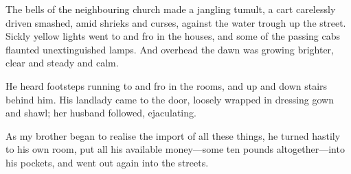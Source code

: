 The bells of the neighbouring church made a jangling tumult, a cart carelessly driven smashed, amid shrieks and curses, against the water trough up the street. Sickly yellow lights went to and fro in the houses, and some of the passing cabs flaunted unextinguished lamps. And overhead the dawn was growing brighter, clear and steady and calm.

He heard footsteps running to and fro in the rooms, and up and down stairs behind him. His landlady came to the door, loosely wrapped in dressing gown and shawl; her husband followed, ejaculating.

As my brother began to realise the import of all these things, he turned hastily to his own room, put all his available money—some ten pounds altogether—into his pockets, and went out again into the streets.

